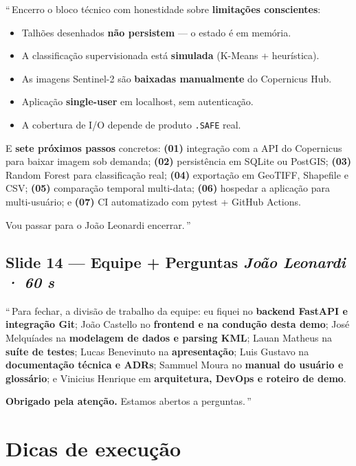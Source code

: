 \documentclass[12pt,a4paper]{article}
\begin{document}
\textquotedblleft\,Encerro o bloco técnico com honestidade sobre
\textbf{limitações conscientes}:
\begin{itemize}[noitemsep]
  \item Talhões desenhados \textbf{não persistem} — o estado é em memória.
  \item A classificação supervisionada está \textbf{simulada} (K-Means + heurística).
  \item As imagens Sentinel-2 são \textbf{baixadas manualmente} do Copernicus Hub.
  \item Aplicação \textbf{single-user} em localhost, sem autenticação.
  \item A cobertura de I/O depende de produto \texttt{.SAFE} real.
\end{itemize}

E \textbf{sete próximos passos} concretos:
\textbf{(01)} integração com a API do Copernicus para baixar imagem
sob demanda; \textbf{(02)} persistência em SQLite ou PostGIS;
\textbf{(03)} Random Forest para classificação real;
\textbf{(04)} exportação em GeoTIFF, Shapefile e CSV;
\textbf{(05)} comparação temporal multi-data;
\textbf{(06)} hospedar a aplicação para multi-usuário; e
\textbf{(07)} CI automatizado com pytest + GitHub Actions.

Vou passar para o João Leonardi encerrar.\,\textquotedblright

\subsection*{Slide 14 — Equipe + Perguntas \hfill \textit{João Leonardi · 60 s}}

\textquotedblleft\,Para fechar, a divisão de trabalho da equipe:
eu fiquei no \textbf{backend FastAPI e integração Git};
João Castello no \textbf{frontend e na condução desta demo};
José Melquíades na \textbf{modelagem de dados e parsing KML};
Lauan Matheus na \textbf{suíte de testes};
Lucas Benevinuto na \textbf{apresentação};
Luis Gustavo na \textbf{documentação técnica e ADRs};
Sammuel Moura no \textbf{manual do usuário e glossário};
e Vinicius Henrique em \textbf{arquitetura, DevOps e roteiro de demo}.

\textbf{Obrigado pela atenção.} Estamos abertos a perguntas.\,\textquotedblright

\newpage

\section*{Dicas de execução}
\end{document}
